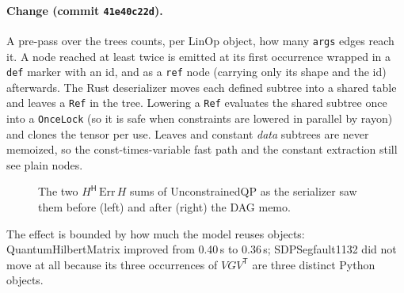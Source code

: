 \documentclass[11pt,a4paper]{article}
\newcommand{\code}[1]{\texttt{#1}}
\newcommand{\T}{\mathsf{T}}
\begin{document}
\paragraph{Change (commit \code{41e40c22d}).} A pre-pass over the trees counts, per LinOp object,
how many \code{args} edges reach it. A node reached at least twice is emitted at its first occurrence
wrapped in a \code{def} marker with an id, and as a \code{ref} node (carrying only its shape and the
id) afterwards. The Rust deserializer moves each defined subtree into a shared table and leaves a
\code{Ref} in the tree. Lowering a \code{Ref} evaluates the shared subtree once into a
\code{OnceLock} (so it is safe when constraints are lowered in parallel by rayon) and clones the tensor
per use. Leaves and constant \emph{data} subtrees are never memoized, so the const-times-variable fast
path and the constant extraction still see plain nodes.

\begin{figure}[H]
\centering
{}
\caption{The two $H^{\mathsf H}\,\mathrm{Err}\,H$ sums of UnconstrainedQP as the serializer saw them
before (left) and after (right) the DAG memo.}
\end{figure}

The effect is bounded by how much the model reuses objects: QuantumHilbertMatrix improved from
0.40\,s to 0.36\,s; SDPSegfault1132 did not move at all because its three occurrences of
$VGV^\T$ are three distinct Python objects.
\end{document}
